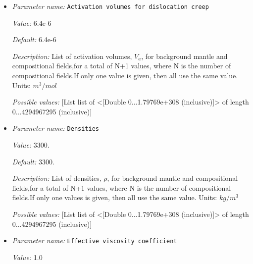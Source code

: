 \begin{itemize}
{\it Default:} 6.4e-6


{\it Description:} List of activation volumes, $V_a$, for background mantle and compositional fields,for a total of N+1 values, where N is the number of compositional fields.If only one value is given, then all use the same value.  Units: $m^3 / mol$


{\it Possible values:} [List list of <[Double 0...1.79769e+308 (inclusive)]> of length 0...4294967295 (inclusive)]
\item {\it Parameter name:} {\tt Activation volumes for dislocation creep}
\label{parameters:Material model/DiffusionDislocation/Activation volumes for dislocation creep}


{\it Value:} 6.4e-6


{\it Default:} 6.4e-6


{\it Description:} List of activation volumes, $V_a$, for background mantle and compositional fields,for a total of N+1 values, where N is the number of compositional fields.If only one value is given, then all use the same value.  Units: $m^3 / mol$


{\it Possible values:} [List list of <[Double 0...1.79769e+308 (inclusive)]> of length 0...4294967295 (inclusive)]
\item {\it Parameter name:} {\tt Densities}
\label{parameters:Material model/DiffusionDislocation/Densities}


{\it Value:} 3300.


{\it Default:} 3300.


{\it Description:} List of densities, $\rho$, for background mantle and compositional fields,for a total of N+1 values, where N is the number of compositional fields.If only one values is given, then all use the same value.  Units: $kg / m^3$


{\it Possible values:} [List list of <[Double 0...1.79769e+308 (inclusive)]> of length 0...4294967295 (inclusive)]
\item {\it Parameter name:} {\tt Effective viscosity coefficient}
\label{parameters:Material model/DiffusionDislocation/Effective viscosity coefficient}


{\it Value:} 1.0



\end{itemize}
